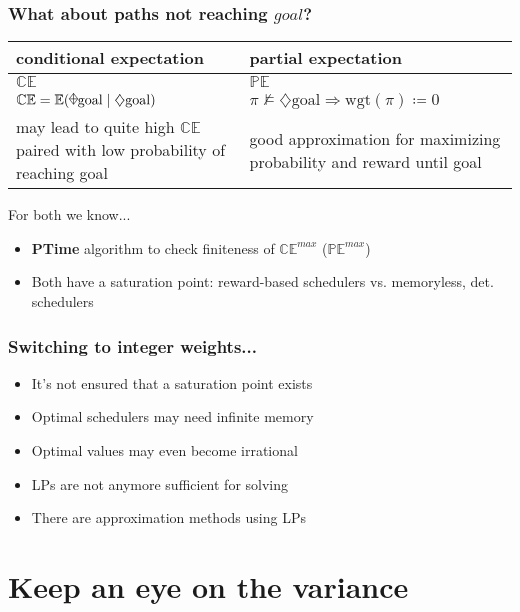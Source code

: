 \documentclass[onlymath]{beamer}
\begin{document}
\begin{frame}
\frametitle{What about paths not reaching $goal$?}
\begin{tabular}{|p{5cm}|p{5cm}|}
\hline
conditional expectation & partial expectation \\ \hline \pause 
$\mathbb{CE}$ & $\mathbb{PE}$ \\ \hline \pause
$\mathbb{CE} = \mathbb{E}(\rawdiaplus \mathrm{goal}\mid \diamondsuit \mathrm{goal})$ & $\pi \nvDash \diamondsuit\mathrm{goal} \Rightarrow \mathrm{wgt}(\pi)\coloneqq0$ \\ \hline \pause
may lead to quite high $\mathbb{CE}$ paired with \newline low probability of reaching goal & good approximation for \newline maximizing probability and reward until goal\\ \hline
\end{tabular}
\pause

\vspace{2ex}
For both we know...
\begin{itemize}
	\item \textbf{PTime} algorithm to check finiteness of $\mathbb{CE}^{max}$ ($\mathbb{PE}^{max}$) \pause
	\item Both have a saturation point: reward-based schedulers vs. memoryless, det. schedulers \pause
\end{itemize}
\end{frame}

\begin{frame}
	\frametitle{Switching to integer weights...}
	\begin{itemize}
		\item It's not ensured that a saturation point exists \pause
		\item Optimal schedulers may need infinite memory \pause
		\item Optimal values may even become irrational \pause
		\item LPs are not anymore sufficient for solving \pause
		\item There are approximation methods using LPs
	\end{itemize}
\end{frame}

\section{Keep an eye on the variance}
\end{document}
